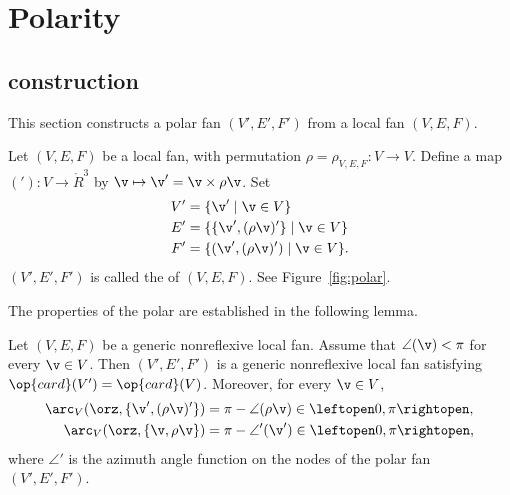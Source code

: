 \section{Polarity}


\subsection{construction}

This section constructs a polar fan $(V',E',F')$ from a local fan $(V,E,F)$.

\begin{definition}[polar]
  Let $(V,E,F)$ be a local fan, with permutation
  $\rho=\rho_{V,E,F}:V\to V$.  Define a map $('): V \to \ring{R}^3$ by
  $\v\mapsto\v' = \v\times\rho\v$.  Set
\begin{align*}
V' & = \{\v' \mid \v\in V\}\\
E' & = \{\{\v',(\rho\v)'\}\mid \v\in V\}\\
F' &=\{ (\v',(\rho\v)') \mid \v\in V\}.
\end{align*}
$(V',E',F')$ is called the  of $(V,E,F)$.
See Figure~\ref{fig:polar}.
\end{definition}
%
%
%
%

\figHEABLRG %

The properties of the polar are established in the
following lemma.

\begin{lemma}\label{lemma:polar-fan}
  Let $(V,E,F)$ be a generic nonreflexive local fan. 
Assume that $\angle(\v)<\pi$ for every $\v\in V$.  Then $(V',E',F')$ is
a generic nonreflexive local fan satisfying $\op{card}(V')=\op{card}(V)$.
Moreover, for every $\v\in V$,
\begin{align*}
\arc_V(\orz,\{\v',(\rho\v)'\}) 
&= \pi - \angle(\rho\v) \in \leftopen 0,\pi\rightopen,\\
\arc_V(\orz,\{\v,\rho\v\}) 
&= \pi - \angle'(\v')\in\leftopen 0,\pi\rightopen,
\end{align*}
where $\angle'$ is the azimuth angle function on the nodes of the
polar fan $(V',E',F')$.
\end{lemma}


